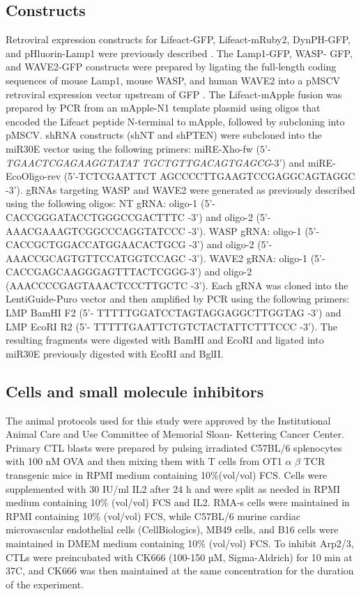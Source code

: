 \subsection{Constructs}
Retroviral expression constructs for Lifeact-GFP, Lifeact-mRuby2, DynPH-GFP, and pHluorin-Lamp1 were previously described \cite{LeFloch2013, Rak2011}. The Lamp1-GFP, WASP- GFP, and WAVE2-GFP constructs were prepared by ligating the full-length coding sequences of mouse Lamp1, mouse WASP, and human WAVE2 into a pMSCV retroviral expression vector upstream of GFP \cite{Purbhoo2004}. The Lifeact-mApple fusion was prepared by PCR from an mApple-N1 template plasmid using oligos that encoded the Lifeact peptide N-terminal to mApple, followed by subcloning into pMSCV. shRNA constructs (shNT and shPTEN) \cite{LeFloch2013} were subcloned into the miR30E vector using the following primers: miRE-Xho-fw ($5’$-\emph{TGAACTCGAGAAGGTATAT TGCTGTTGACAGTGAGCG}-$3’$) and miRE-EcoOligo-rev (5’-TCTCGAATTCT AGCCCCTTGAAGTCCGAGGCAGTAGGC -3’). gRNAs targeting WASP and WAVE2 were generated as previously described using the following oligos: NT gRNA: oligo-1 (5’- CACCGGGATACCTGGGCCGACTTTC -3’) and oligo-2 (5’- AAACGAAAGTCGGCCCAGGTATCCC -3’). WASP gRNA: oligo-1 (5’- CACCGCTGGACCATGGAACACTGCG -3’) and oligo-2 (5’-
AAACCGCAGTGTTCCATGGTCCAGC -3’). WAVE2 gRNA: oligo-1 (5’-CACCGAGCAAGGGAGTTTACTCGGG-3’) and oligo-2 (AAACCCCGAGTAAACTCCCTTGCTC -3’). Each gRNA was cloned into the LentiGuide-Puro vector and then amplified by PCR using the following primers: LMP BamHI F2 (5’- TTTTTGGATCCTAGTAGGAGGCTTGGTAG -3’) and LMP EcoRI R2 (5’- TTTTTGAATTCTGTCTACTATTCTTTCCC -3’). The resulting fragments were digested with BamHI and EcoRI and ligated into miR30E previously digested with EcoRI and BglII.

\subsection{Cells and small molecule inhibitors}
The animal protocols used for this study were approved by the Institutional Animal Care and Use Committee of Memorial Sloan- Kettering Cancer Center. Primary CTL blasts were prepared by pulsing irradiated C57BL/6 splenocytes with 100 nM OVA and then mixing them with T cells from OT1 $\alpha$ $\beta$ TCR transgenic mice in RPMI medium containing 10\%(vol/vol) FCS. Cells were supplemented with 30 IU/ml IL2 after 24 h and were split as needed in RPMI medium containing 10\% (vol/vol) FCS and IL2. RMA-s cells were maintained in RPMI containing 10\% (vol/vol) FCS, while C57BL/6 murine cardiac microvascular endothelial cells (CellBiologics), MB49 cells, and B16 cells were maintained in DMEM medium containing 10\% (vol/vol) FCS. To inhibit Arp2/3, CTLs were preincubated with CK666 (100-150 µM, Sigma-Aldrich) for 10 min at 37\degree C, and CK666 was then maintained at the same concentration for the duration of the experiment.

